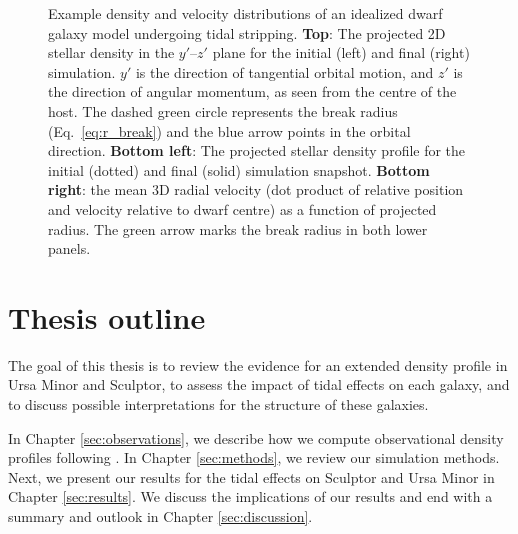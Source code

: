 \begin{figure}
\centering
{}
\caption[Example tidal simulation]{Example density and velocity
distributions of an idealized dwarf galaxy model undergoing tidal
stripping. \textbf{Top}: The projected 2D stellar density in the
\(y'\)--\(z'\) plane for the initial (left) and final (right)
simulation. \(y'\) is the direction of tangential orbital motion, and
\(z'\) is the direction of angular momentum, as seen from the centre of
the host. The dashed green circle represents the break radius
(Eq.~\ref{eq:r_break}) and the blue arrow points in the orbital
direction. \textbf{Bottom left}: The projected stellar density profile
for the initial (dotted) and final (solid) simulation snapshot.
\textbf{Bottom right}: the mean 3D radial velocity (dot product of
relative position and velocity relative to dwarf centre) as a function
of projected radius. The green arrow marks the break radius in both
lower panels.}\label{fig:idealized_break_radius}
\end{figure}

\section{Thesis outline}\label{thesis-outline}

The goal of this thesis is to review the evidence for an extended
density profile in Ursa Minor and Sculptor, to assess the impact of
tidal effects on each galaxy, and to discuss possible interpretations
for the structure of these galaxies.

In Chapter \ref{sec:observations}, we describe how we compute
observational density profiles following \citet{jensen+2024}. In Chapter
\ref{sec:methods}, we review our simulation methods. Next, we present
our results for the tidal effects on Sculptor and Ursa Minor in Chapter
\ref{sec:results}. We discuss the implications of our results and end
with a summary and outlook in Chapter \ref{sec:discussion}.
